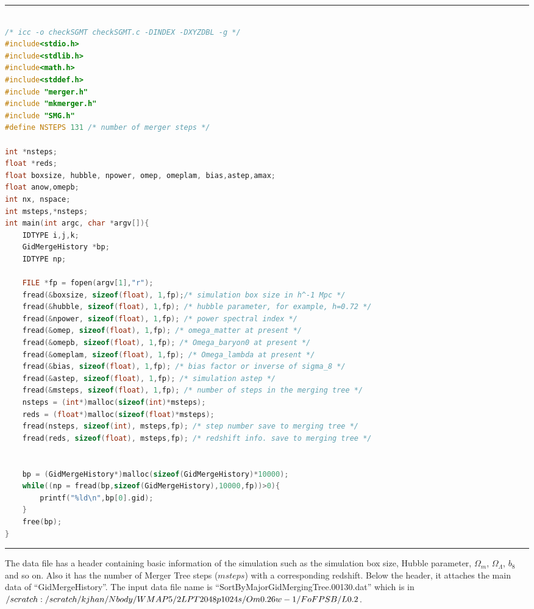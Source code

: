 \documentclass[openleft]{memoir}
\begin{document}
\noindent\rule{\textwidth}{1pt}
\begin{lstlisting}[language=c]

/* icc -o checkSGMT checkSGMT.c -DINDEX -DXYZDBL -g */
#include<stdio.h>
#include<stdlib.h>
#include<math.h>
#include<stddef.h>
#include "merger.h"
#include "mkmerger.h"
#include "SMG.h"
#define NSTEPS 131 /* number of merger steps */

int *nsteps;
float *reds;
float boxsize, hubble, npower, omep, omeplam, bias,astep,amax;
float anow,omepb;
int nx, nspace;
int msteps,*nsteps;
int main(int argc, char *argv[]){
    IDTYPE i,j,k;
    GidMergeHistory *bp;
    IDTYPE np;

    FILE *fp = fopen(argv[1],"r");
    fread(&boxsize, sizeof(float), 1,fp);/* simulation box size in h^-1 Mpc */
    fread(&hubble, sizeof(float), 1,fp); /* hubble parameter, for example, h=0.72 */
    fread(&npower, sizeof(float), 1,fp); /* power spectral index */
    fread(&omep, sizeof(float), 1,fp); /* omega_matter at present */
    fread(&omepb, sizeof(float), 1,fp); /* Omega_baryon0 at present */
    fread(&omeplam, sizeof(float), 1,fp); /* Omega_lambda at present */
    fread(&bias, sizeof(float), 1,fp); /* bias factor or inverse of sigma_8 */
    fread(&astep, sizeof(float), 1,fp); /* simulation astep */
    fread(&msteps, sizeof(float), 1,fp); /* number of steps in the merging tree */
    nsteps = (int*)malloc(sizeof(int)*msteps);
    reds = (float*)malloc(sizeof(float)*msteps);
    fread(nsteps, sizeof(int), msteps,fp); /* step number save to merging tree */
    fread(reds, sizeof(float), msteps,fp); /* redshift info. save to merging tree */


    bp = (GidMergeHistory*)malloc(sizeof(GidMergeHistory)*10000);
    while((np = fread(bp,sizeof(GidMergeHistory),10000,fp))>0){
        printf("%ld\n",bp[0].gid);
    }
    free(bp);
}


\end{lstlisting}
\noindent\rule{\textwidth}{1pt}
The data file has a header containing basic information of the simulation such as the simulation box size,
Hubble parameter, $\Omega_m$, $\Omega_\Lambda$, $b_8$ and so on. Also it has the number of Merger Tree steps ($msteps$)
with a corresponding redshift. Below the header, it attaches the main data of ``GidMergeHistory''.
The input data file name is ``SortByMajorGidMergingTree.00130.dat'' which is in \\
$\//scratch:
\//scratch\//kjhan\//Nbody\//WMAP5\//2LPT2048p1024s\//Om0.26w-1 
\//FoFPSB\//
L0.2$.
\end{document}
